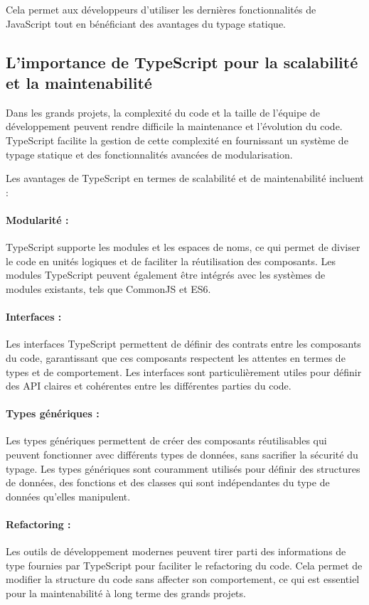 Cela permet aux développeurs d'utiliser les dernières fonctionnalités de JavaScript tout en bénéficiant des avantages du typage statique.

\subsection{L'importance de TypeScript pour la scalabilité et la maintenabilité}

Dans les grands projets, la complexité du code et la taille de l'équipe de développement peuvent rendre difficile la maintenance et l'évolution du code. TypeScript facilite la gestion de cette complexité en fournissant un système de typage statique et des fonctionnalités avancées de modularisation.

Les avantages de TypeScript en termes de scalabilité et de maintenabilité incluent :

\paragraph{Modularité :} TypeScript supporte les modules et les espaces de noms, ce qui permet de diviser le code en unités logiques et de faciliter la réutilisation des composants. Les modules TypeScript peuvent également être intégrés avec les systèmes de modules existants, tels que CommonJS et ES6.
\paragraph{Interfaces :} Les interfaces TypeScript permettent de définir des contrats entre les composants du code, garantissant que ces composants respectent les attentes en termes de types et de comportement. Les interfaces sont particulièrement utiles pour définir des API claires et cohérentes entre les différentes parties du code.
\paragraph{Types génériques :} Les types génériques permettent de créer des composants réutilisables qui peuvent fonctionner avec différents types de données, sans sacrifier la sécurité du typage. Les types génériques sont couramment utilisés pour définir des structures de données, des fonctions et des classes qui sont indépendantes du type de données qu'elles manipulent.
\paragraph{Refactoring :} Les outils de développement modernes peuvent tirer parti des informations de type fournies par TypeScript pour faciliter le refactoring du code. Cela permet de modifier la structure du code sans affecter son comportement, ce qui est essentiel pour la maintenabilité à long terme des grands projets.

